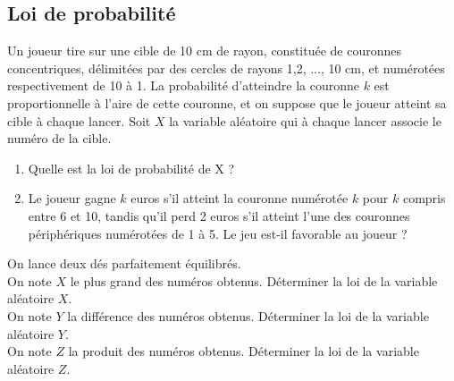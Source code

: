\documentclass{book}
\begin{document}
\subsection*{Loi de probabilité}
\begin{Exercice}
Un joueur tire sur une cible de 10 cm de rayon, constituée de couronnes concentriques,
délimitées par des cercles de rayons 1,2, ..., 10 cm, et numérotées respectivement de 10 à 1. La
probabilité d'atteindre la couronne $k$ est proportionnelle à l'aire de cette couronne, et on suppose que
le joueur atteint sa cible à chaque lancer. Soit $X$ la variable aléatoire qui à chaque lancer associe le numéro de la cible.
\begin{enumerate}
\item Quelle est la loi de probabilité de X ?
\item Le joueur gagne $k$ euros s'il atteint la couronne numérotée $k$ pour $k$ compris entre 6 et 10, tandis qu'il perd 2 euros s'il atteint l'une des couronnes périphériques numérotées de 1 à 5. Le jeu est-il
favorable au joueur ?
\end{enumerate}
\end{Exercice}
\begin{Exercice}
On lance deux dés parfaitement équilibrés.\\
On note $X$ le plus grand des numéros obtenus. Déterminer la loi de la variable aléatoire $X$.\\
On note $Y$ la différence des numéros obtenus. Déterminer la loi de la variable aléatoire $Y$.\\
On note $Z$ la produit des numéros obtenus. Déterminer la loi de la variable aléatoire $Z$.
\end{Exercice}
\end{document}

